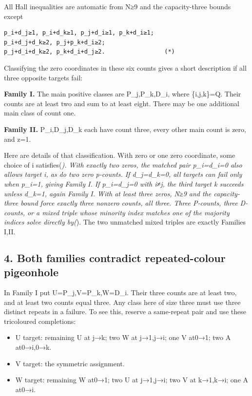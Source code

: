 \documentclass[
  10pt,
]{article}
\providecommand{\tightlist}{%
  \setlength{\itemsep}{0pt}\setlength{\parskip}{0pt}}
\begin{document}
All Hall inequalities are automatic from N≥9 and the capacity-three
bounds except

\begin{verbatim}
p_i+d_j≥1, p_i+d_k≥1, p_j+d_i≥1, p_k+d_i≥1;
p_i+d_j+d_k≥2, p_j+p_k+d_i≥2;
p_j+d_i+d_k≥2, p_k+d_i+d_j≥2.                 (*)
\end{verbatim}

Classifying the zero coordinates in these six counts gives a short
description if all three opposite targets fail:

\textbf{Family I.} The main positive classes are P\_j,P\_k,D\_i, where
\{i,j,k\}=Q. Their counts are at least two and sum to at least eight.
There may be one additional main class of count one.

\textbf{Family II.} P\_i,D\_j,D\_k each have count three, every other
main count is zero, and z=1.

Here are details of that classification. With zero or one zero
coordinate, some choice of i satisfies(\emph{). With exactly two zeros,
the matched pair p\_i=d\_i=0 also allows target i, as do two zero
p-counts. If d\_j=d\_k=0, all targets can fail only when p\_i=1, giving
Family I. If p\_i=d\_j=0 with i≠j, the third target k succeeds unless
d\_k=1, again Family I. With at least three zeros, N≥9 and the
capacity-three bound force exactly three nonzero counts, all three.
Three P-counts, three D-counts, or a mixed triple whose minority index
matches one of the majority indices solve directly by(}). The two
unmatched mixed triples are exactly Families I,II.

\hypertarget{both-families-contradict-repeated-colour-pigeonhole}{%
\subsection*{4. Both families contradict repeated-colour
pigeonhole}\label{both-families-contradict-repeated-colour-pigeonhole}}

In Family I put U=P\_j,V=P\_k,W=D\_i. Their three counts are at least
two, and at least two counts equal three. Any class here of size three
must use three distinct repeats in a failure. To see this, reserve a
same-repeat pair and use these tricoloured completions:

\begin{itemize}
\tightlist
\item
  U target: remaining U at j→k; two W at j→1,j→i; one V at0→1; two A
  at0→i,0→k.
\item
  V target: the symmetric assignment.
\item
  W target: remaining W at0→1; two U at j→1,j→i; two V at k→1,k→i; one A
  at0→i.
\end{itemize}
\end{document}

